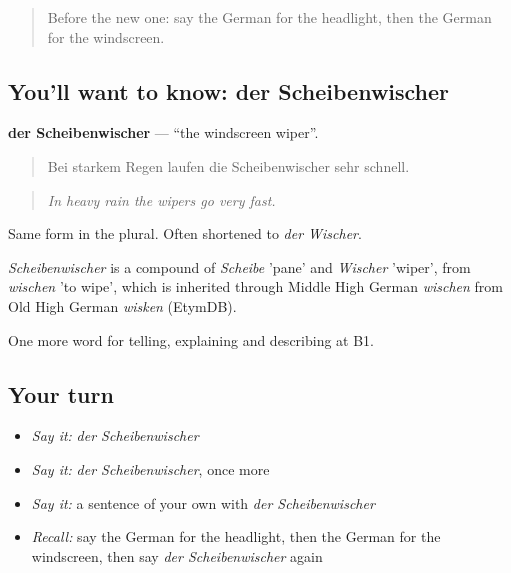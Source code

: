 \label{lesson:GE-C400-scheibenwischer}



\begin{quote}
Before the new one: say the German for the headlight, then the German for the windscreen.
\end{quote}

\subsection*{You'll want to know: der Scheibenwischer}
\textbf{der Scheibenwischer} — \textquotedblleft{}the windscreen wiper\textquotedblright{}.

\begin{quote}
Bei starkem Regen laufen die Scheibenwischer sehr schnell.
\end{quote}

\begin{quote}
\emph{In heavy rain the wipers go very fast.}
\end{quote}

Same form in the plural. Often shortened to \emph{der Wischer}.

\begin{cousinweb}
\emph{Scheibenwischer} is a compound of \emph{Scheibe} 'pane' and \emph{Wischer} 'wiper', from \emph{wischen} 'to wipe', which is inherited through Middle High German \emph{wischen} from Old High German \emph{wisken} (EtymDB).
\end{cousinweb}

\begin{grammarlens}[title={What you've built}]
One more word for telling, explaining and describing at B1.
\end{grammarlens}

\subsection*{Your turn}
\begin{itemize}
\raggedright
  \item \emph{Say it:} \emph{der Scheibenwischer}
  \item \emph{Say it:} \emph{der Scheibenwischer}, once more
  \item \emph{Say it:} a sentence of your own with \emph{der Scheibenwischer}
  \item \emph{Recall:} say the German for the headlight, then the German for the windscreen, then say \emph{der Scheibenwischer} again
\end{itemize}

